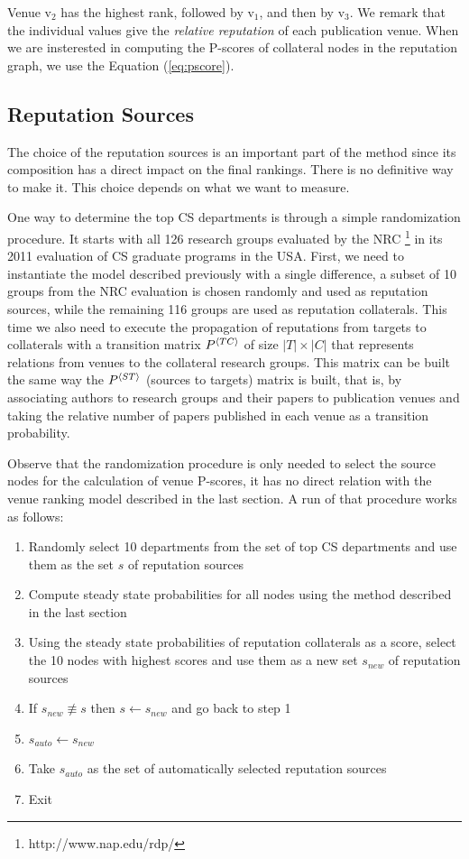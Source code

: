 \documentclass[notitlepage]{svjour3}
\begin{document}
Venue $\mbox{v}_2$ has the highest rank, followed by $\mbox{v}_1$, and then by $\mbox{v}_3$. We remark that the individual values give the {\em relative reputation} of each publication venue. 
%
When we are insterested in computing the P-scores of collateral nodes in the reputation graph, we use the Equation (\ref{eq:pscore}).


\subsection{Reputation Sources}
\label{sec:rep-sources}

The choice of the reputation sources is an important part of the method since 
its composition has a direct impact on the final rankings. 
There is no definitive way to make it. This choice depends on what we want to measure. 

One way to determine the top CS departments is through a simple randomization procedure.
It starts with all 126 research groups evaluated by the NRC \footnote{http://www.nap.edu/rdp/}
in its 2011 evaluation of CS graduate programs in the USA. 
First, we need to instantiate the model described previously with a single difference, 
a subset of 10 groups from the NRC evaluation is chosen randomly and used as reputation sources, while the remaining 116 groups
are used as reputation collaterals. This time we also need to execute the propagation of reputations 
from targets to collaterals with a transition matrix $P{^{\langle TC \rangle}}$ of size $|T|\times |C|$ that represents
relations from venues to the collateral research groups. This matrix can be built the same way
the $P{^{\langle ST \rangle}}$ (sources to targets) matrix is built, that is, by associating authors to research 
groups and their papers to publication venues and taking the relative number of papers published
in each venue as a transition probability.

Observe that the randomization procedure is only needed to
select the source nodes for the calculation of venue P-scores, it has no direct relation with the venue ranking
model described in the last section. A run of that procedure works as follows: 
\begin{enumerate}
\item Randomly select 10 departments from the set of top CS departments and use them as the set $s$ of reputation sources
\item Compute steady state probabilities for all nodes using the method described in the last section
\item Using the steady state probabilities of reputation collaterals as a score, select the 10 nodes with 
highest scores and use them as a new set $s_{new}$ of reputation sources
\item If $s_{new} \not \equiv s$ then $s \leftarrow s_{new}$ and go back to step 1
\item $s_{auto} \leftarrow s_{new}$ 
\item Take $s_{auto}$ as the set of automatically selected reputation sources
\item Exit
\end{enumerate}
\end{document}

